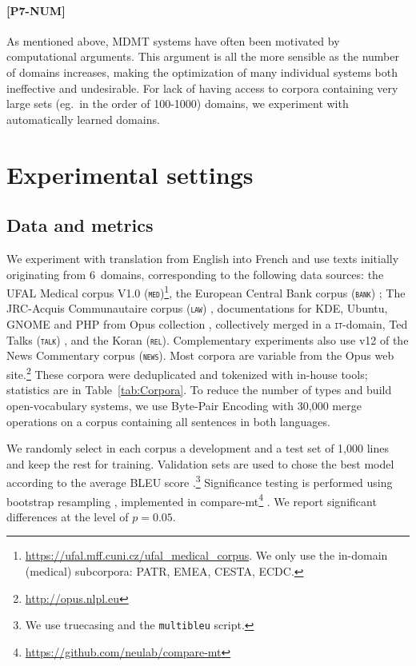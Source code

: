 \documentclass[11pt,a4paper]{article}
\newcommand{\fyDone}[1]{\done[FY]\Todo[FY:]{\textcolor{orange}{#1}}}
\newcommand{\fyFuture}[1]{\done[FY]\Todo[FY:]{\textcolor{red}{#1}}}
\newcommand{\revision}[1]{#1}
\newcommand{\domain}[1]{\texttt{\textsc{#1}}}
\begin{document}
\paragraph{[P7-NUM]} As mentioned above, MDMT systems have often been motivated by computational arguments. This argument is all the more sensible as the number of domains increases, making the optimization of many individual systems both ineffective and undesirable. For lack of having access to corpora containing very large sets (eg.\ in the order of 100-1000) domains, we experiment with automatically learned domains.\fyFuture{considering a varying number of clusters.}

\section{Experimental settings \label{sec:experiments}}

\subsection{Data and metrics \label{ssec:corpora}}

We experiment with translation from English into French and use texts initially originating from 6~domains, corresponding to the following data sources: the UFAL Medical corpus V1.0 (\domain{med})\footnote{\url{https://ufal.mff.cuni.cz/ufal_medical_corpus}. \revision{We only use the in-domain (medical) subcorpora: PATR, EMEA, CESTA, ECDC.}}, the European Central Bank corpus (\domain{bank}) \cite{Tiedemann12parallel}; The JRC-Acquis Communautaire corpus (\domain{law}) \cite{Steinberger06acquis}, documentations for KDE, Ubuntu, GNOME and PHP from Opus collection \cite{Tiedemann09news}, collectively merged in a \domain{it}-domain, Ted Talks (\domain{talk}) \cite{Cettolo12wit}, and the Koran (\domain{rel}). Complementary experiments also use v12 of the News Commentary corpus (\domain{news}). Most corpora are variable from the Opus web site.\footnote{\url{http://opus.nlpl.eu}} These corpora were deduplicated and tokenized with in-house tools; statistics are in Table~\ref{tab:Corpora}. To reduce the number of types and build open-vocabulary systems, we use Byte-Pair Encoding \cite{Sennrich16BPE} with 30,000 merge operations on a corpus containing all sentences in both languages.\fyDone{Add \# number of tokens, also specificity ?}%

We randomly select in each corpus a development and a test set of 1,000 lines and keep the rest for training. Validation sets are used to chose the best model according to the average BLEU score \cite{Papineni02bleu}.\footnote{We use truecasing and the \texttt{multibleu} script.}\fyDone{A word about meta-parameter settings} Significance testing is performed using bootstrap resampling \cite{Koehn04statistical}, implemented in compare-mt\footnote{\url{https://github.com/neulab/compare-mt}} \cite{Neubig19compare-mt}. We report significant differences at the level of $p=0.05$.\fyDone{Fix correct p value}
\end{document}
